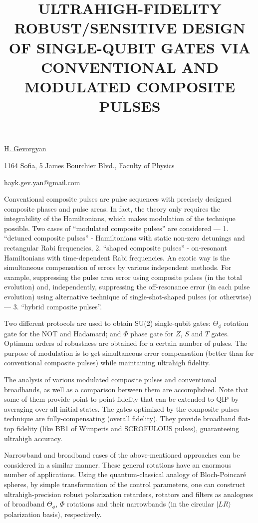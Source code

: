 \title{ULTRAHIGH-FIDELITY ROBUST/SENSITIVE DESIGN OF SINGLE-QUBIT GATES VIA CONVENTIONAL AND MODULATED COMPOSITE PULSES}

\underline{H. Gevorgyan} 

{\normalsize{\vspace{-4mm}
1164 Sofia, 5 James Bourchier Blvd., Faculty of Physics



\email hayk.gev.yan@gmail.com}}

 Conventional composite pulses are pulse sequences with precisely designed composite phases and pulse areas. In fact, the theory only requires the integrability of the Hamiltonians, which makes modulation of the technique possible. Two cases of ``modulated composite pulses'' are considered --- 1. ``detuned composite pulses'' - Hamiltonians with static non-zero detunings and rectangular Rabi frequencies, 2. ``shaped composite pulses'' - on-resonant Hamiltonians with time-dependent Rabi frequencies. An exotic way is the simultaneous compensation of errors by various independent methods. For example, suppressing the pulse area error using composite pulses (in the total evolution) and, independently, suppressing the off-resonance error (in each pulse evolution) using alternative technique of single-shot-shaped pulses (or otherwise) --- 3. ``hybrid composite pulses''.

 Two different protocols are used to obtain SU(2) single-qubit gates: $\Theta_{\phi}$ rotation gate for the NOT and Hadamard; and $\Phi$ phase gate for $Z$, $S$ and $T$ gates. Optimum orders of robustness are obtained for a certain number of pulses. The purpose of modulation is to get simultaneous error compensation (better than for conventional composite pulses) while maintaining ultrahigh fidelity.
 
 The analysis of various modulated composite pulses and conventional broadbands, as well as a comparison between them are accomplished. Note that some of them provide point-to-point fidelity that can be extended to QIP by averaging over all initial states. The gates optimized by the composite pulses technique are fully-compensating (overall fidelity). They provide broadband flat-top fidelity (like BB1 of Wimperis and SCROFULOUS pulses), guaranteeing ultrahigh accuracy.
 
Narrowband and broadband cases of the above-mentioned approaches can be considered in a similar manner. These general rotations have an enormous number of applications. Using the quantum-classical analogy of Bloch-Poincar\'e spheres, by simple transformation of the control parameters, one can construct ultrahigh-precision robust polarization retarders, rotators and filters as analogues of broadband $\Theta_{\phi}$, $\Phi$ rotations and their narrowbands (in the circular $|LR\rangle$ polarization basis), respectively.

\vspace{\baselineskip}
